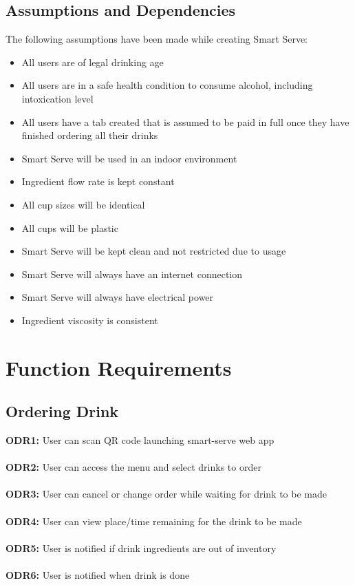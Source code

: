 \documentclass{article}
\begin{document}
\subsection{Assumptions and Dependencies} %
    The following assumptions have been made while creating Smart Serve:
    \begin{itemize}
        \item All users are of legal drinking age
        \item All users are in a safe health condition to consume alcohol, including intoxication level
        \item All users have a tab created that is assumed to be paid in full once they have finished ordering all their drinks
        \item Smart Serve will be used in an indoor environment
        \item Ingredient flow rate is kept constant
        \item All cup sizes will be identical
        \item All cups will be plastic
        \item Smart Serve will be kept clean and not restricted due to usage
        \item Smart Serve will always have an internet connection
        \item Smart Serve will always have electrical power
        \item Ingredient viscosity is consistent
    \end{itemize}

\section{Function Requirements}
\subsection{Ordering Drink}
    \noindent\textbf{ODR1:} User can scan QR code launching smart-serve web app \\\\ 
    \textbf{ODR2:} User can access the menu and select drinks to order\\\\ 
    \textbf{ODR3:} User can cancel or change order while waiting for drink to be made \\\\ 
    \textbf{ODR4:} User can view place/time remaining for the drink to be made \\\\ 
    \textbf{ODR5:} User is notified if drink ingredients are out of inventory\\\\ 
    \textbf{ODR6:} User is notified when drink is done\\
\end{document}
